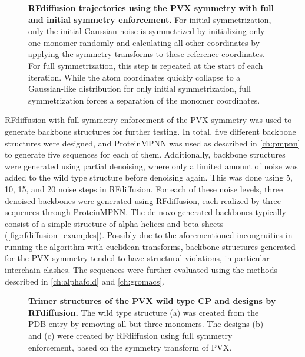 \begin{figure}[!hbtp]
    \centering
    
    \caption{\textbf{RFdiffusion trajectories using the PVX symmetry with full and initial symmetry enforcement. } For initial symmetrization, only the initial Gaussian noise is symmetrized by initializing only one monomer randomly and calculating all other coordinates by applying the symmetry transforms to these reference coordinates. For full symmetrization, this step is repeated at the start of each iteration. While the atom coordinates quickly collapse to a Gaussian-like distribution for only initial symmetrization, full symmetrization forces a separation of the monomer coordinates. }
    \label{fig:rfdiff_sym_trajectories}
\end{figure}

\FloatBarrier

RFdiffusion with full symmetry enforcement of the PVX symmetry was used to generate backbone structures for further testing. In total, five different backbone structures were designed, and ProteinMPNN was used as described in \autoref{ch:pmpnn} to generate five sequences for each of them. Additionally, backbone structures were generated using partial denoising, where only a limited amount of noise was added to the wild type structure before denoising again. This was done using 5, 10, 15, and 20 noise steps in RFdiffusion. For each of these noise levels, three denoised backbones were generated using RFdiffusion, each realized by three sequences through ProteinMPNN. The de novo generated backbones typically consist of a simple structure of alpha helices and beta sheets (\autoref{fig:rfdiffusion_examples}). Possibly due to the aforementioned incongruities in running the algorithm with euclidean transforms, backbone structures generated for the PVX symmetry tended to have structural violations, in particular interchain clashes. The sequences were further evaluated using the methods described in \autoref{ch:alphafold} and \autoref{ch:gromacs}.


\begin{figure}
\centering

\caption{\textbf{Trimer structures of the PVX wild type CP and designs by RFdiffusion. } The wild type structure (a) was created from the PDB entry by removing all but three monomers. The designs (b) and (c) were created by RFdiffusion using full symmetry enforcement, based on the symmetry transform of PVX. }
\label{fig:rfdiffusion_examples}
\end{figure}

